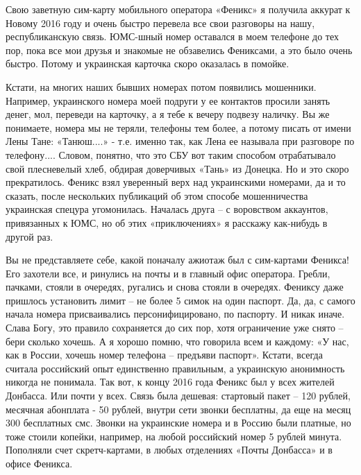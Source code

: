Свою заветную сим-карту мобильного оператора «Феникс» я получила аккурат к
Новому 2016 году и очень быстро перевела все свои разговоры на нашу,
республиканскую связь. ЮМС-шный номер оставался в моем телефоне до тех пор,
пока все мои друзья и знакомые не обзавелись Фениксами, а это было очень
быстро. Потому и украинская карточка скоро оказалась в помойке.

Кстати, на многих наших бывших номерах потом появились мошенники. Например,
украинского номера моей подруги у ее контактов просили занять денег, мол,
переведи на карточку, а я тебе к вечеру подвезу наличку. Вы же понимаете,
номера мы не теряли, телефоны тем более, а потому писать от имени Лены Тане:
«Танюш....» - т.е. именно так, как Лена ее называла при разговоре по телефону....
Словом, понятно, что это СБУ вот таким способом отрабатывало свой плесневелый
хлеб, обдирая доверчивых «Тань» из Донецка. Но и это скоро прекратилось. Феникс
взял уверенный верх над украинскими номерами, да и то сказать, после нескольких
публикаций об этом способе мошенничества украинская спецура угомонилась.
Началась друга – с воровством аккаунтов, привязанных к ЮМС, но об этих
«приключениях» я расскажу как-нибудь в другой раз.


Вы не представляете себе, какой поначалу ажиотаж был с сим-картами Феникса! Его
захотели все, и ринулись на почты и в главный офис оператора. Гребли, пачками,
стояли в очередях, ругались и снова стояли в очередях. Фениксу даже пришлось
установить лимит – не более 5 симок на один паспорт. Да, да, с самого начала
номера присваивались персонифицировано, по паспорту. И никак иначе. Слава Богу,
это правило сохраняется до сих пор, хотя ограничение уже снято – бери сколько
хочешь. А я хорошо помню, что говорила всем и каждому: «У нас, как в России,
хочешь номер телефона – предъяви паспорт». Кстати, всегда считала российский
опыт единственно правильным, а украинскую анонимность никогда не понимала. Так
вот, к концу 2016 года Феникс был у всех жителей Донбасса. Или почти у всех.
Связь была дешевая: стартовый пакет – 120 рублей, месячная абонплата - 50
рублей, внутри сети звонки бесплатны, да еще на месяц 300 бесплатных смс.
Звонки на украинские номера и в Россию были платные, но тоже стоили копейки,
например, на любой российский номер 5 рублей минута. Пополняли счет
скретч-картами, в любых отделениях «Почты Донбасса» и в офисе Феникса.


